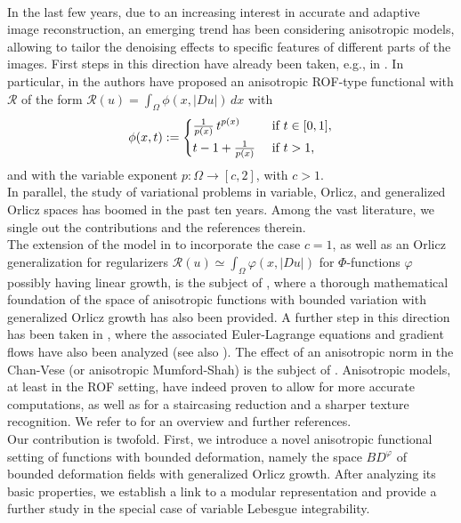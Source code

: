 \documentclass[a4paper,11pt,oneside,notitlepage]{article}
\numberwithin{equation}{section}
\newcommand{\vphi}{\varphi}
\begin{document}
\\
In the last few years, due to an increasing interest in accurate and adaptive image reconstruction, an emerging trend has been considering anisotropic models, allowing to tailor the denoising effects to specific features of different parts of the images. First steps in this direction have already been taken, e.g., in \cite{Bl, CL, SC}. In particular, in \cite{CLR} the authors have proposed an anisotropic ROF-type functional with $\mathcal{R}$ of the form $\mathcal{R}(u) = \int_\Omega \phi(x, |Du|) \, dx$ with
\begin{equation*}
    \phi(x, t) :=
    \begin{dcases}
        \tfrac{1}{p(x)} \, t^{p(x)} & \textnormal{ if } t \in [0,1], \\
        t - 1 + \tfrac{1}{p(x)} & \textnormal{ if } t > 1,
    \end{dcases}
\end{equation*}
and with the variable exponent $p : \Omega \to [c,2]$, with $c > 1$.
\\
In parallel, the study of variational problems in variable, Orlicz, and generalized Orlicz spaces has boomed in the past ten years. Among the vast literature, we single out the contributions \cite{Iwona_book,HHbook,HaH, HHL, HHLT, rao-ren} and the references therein.
\\
The extension of the model in \cite{CLR} to incorporate the case $c = 1$, as well as an Orlicz generalization for regularizers $\mathcal{R}(u) \simeq \int_\Omega \vphi(x,|Du|)$ for $\Phi$-functions $\vphi$ possibly having linear growth, is the subject of \cite{EHH}, where a thorough mathematical foundation of the space of anisotropic functions with bounded variation with generalized Orlicz growth has also been provided. A further step in this direction has been taken in \cite{GLM25}, where the associated Euler-Lagrange equations and gradient flows have also been analyzed (see also \cite{GLM25bis}). The effect of an anisotropic norm in the Chan-Vese (or anisotropic Mumford-Shah) is the subject of \cite{MP}. Anisotropic models, at least in the ROF setting, have indeed proven to allow for more accurate computations, as well as for a staircasing reduction and a sharper texture recognition. We refer to \cite{CWSL,EO,LMM} for an overview and further references.
\\
Our contribution is twofold. First, we introduce a novel anisotropic functional setting of functions with bounded deformation, namely the space $BD^\vphi$ of bounded deformation fields with generalized Orlicz growth. After analyzing its basic properties, we establish a link to a modular representation and provide a further study in the special case of variable Lebesgue integrability. 
\end{document}
